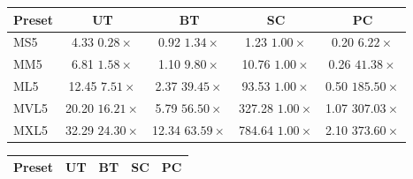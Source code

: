 \begin{table}[t]
\centering
\small
\begin{minipage}{0.49\textwidth}
\centering
\begin{tabular}{l c c c c}
\toprule
\textbf{Preset} & \textbf{UT} & \textbf{BT} & \textbf{SC} & \textbf{PC} \\
\midrule

MS5 & \makecell{4.33 \\ $0.28\times$}
    & \makecell{0.92 \\ $1.34\times$}
    & \makecell{1.23 \\ $1.00\times$}
    & \makecell{0.20 \\ $6.22\times$} \\

MM5 & \makecell{6.81 \\ $1.58\times$}
    & \makecell{1.10 \\ $9.80\times$}
    & \makecell{10.76 \\ $1.00\times$}
    & \makecell{0.26 \\ $41.38\times$} \\

ML5 & \makecell{12.45 \\ $7.51\times$}
    & \makecell{2.37 \\ $39.45\times$}
    & \makecell{93.53 \\ $1.00\times$}
    & \makecell{0.50 \\ $185.50\times$} \\

MVL5 & \makecell{20.20 \\ $16.21\times$}
     & \makecell{5.79 \\ $56.50\times$}
     & \makecell{327.28 \\ $1.00\times$}
     & \makecell{1.07 \\ $307.03\times$} \\

MXL5 & \makecell{32.29 \\ $24.30\times$}
     & \makecell{12.34 \\ $63.59\times$}
     & \makecell{784.64 \\ $1.00\times$}
     & \makecell{2.10 \\ $373.60\times$} \\


\bottomrule
\end{tabular}
\end{minipage}
\hspace{0.001\textwidth}  %
\begin{minipage}{0.48\textwidth}
\centering
\begin{tabular}{l c c c c}
\toprule
\textbf{Preset} & \textbf{UT} & \textbf{BT} & \textbf{SC} & \textbf{PC} \\
\midrule



\end{tabular}
\end{minipage}
\end{table}

